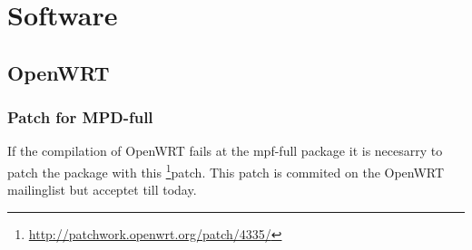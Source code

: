 \section{Software}
\subsection{OpenWRT}
\subsubsection{Patch for MPD-full}
If the compilation of OpenWRT fails at the mpf-full package it is necesarry to patch the package with this \footnote{\url{http://patchwork.openwrt.org/patch/4335/}}{patch}. This patch is commited on the OpenWRT mailinglist but acceptet till today.
%

